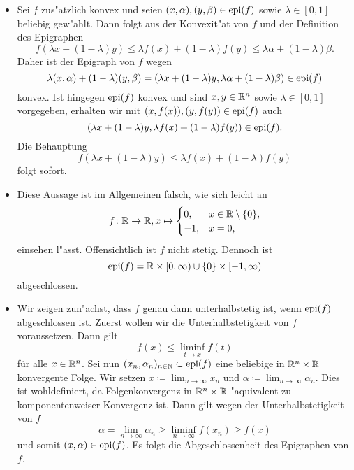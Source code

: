 \begin{itemize}
 \item[(i)] Sei $f$ zus"atzlich konvex und seien $(x,\alpha),(y,\beta)\in\operatorname{epi}(f)$ sowie $\lambda\in[0,1]$ beliebig gew"ahlt.
 Dann folgt aus der Konvexit"at von $f$ und der Definition des Epigraphen
 \begin{displaymath}
  f(\lambda x+(1-\lambda)y)\leq \lambda f(x)+(1-\lambda)f(y)\leq \lambda\alpha+(1-\lambda)\beta.
 \end{displaymath}
 Daher ist der Epigraph von $f$ wegen
 \[
\lambda(x,\alpha)+(1-\lambda)(y,\beta)=
(\lambda x+(1-\lambda)y,\lambda\alpha+(1-\lambda)\beta)\in\operatorname{epi}(f)
 \]
 konvex.
 Ist hingegen $\operatorname{epi}(f)$ konvex und sind $x,y\in\mathbb{R}^n$ sowie $\lambda\in[0,1]$ vorgegeben, erhalten wir mit
 $(x,f(x)),(y,f(y))\in\operatorname{epi}(f)$ auch
\[
 (\lambda x+(1-\lambda)y,\lambda f(x)+(1-\lambda)f(y))\in \operatorname{epi}(f).
 \]
 Die Behauptung
 \begin{displaymath}
  f(\lambda x+(1-\lambda)y)\leq\lambda f(x)+(1-\lambda)f(y)
 \end{displaymath}
 folgt sofort.

 \item[(ii)] Diese Aussage ist im Allgemeinen falsch, wie sich leicht an
 \begin{displaymath}
  f\colon\mathbb{R}\to\mathbb{R}, x\mapsto \begin{cases}
                       0, &x\in\mathbb{R}\setminus\{0\},\\
                       -1, &x=0,
                      \end{cases}
 \end{displaymath}
 einsehen l"asst. Offensichtlich ist $f$ nicht stetig. Dennoch ist
 \begin{displaymath}
  \operatorname{epi}(f)=\mathbb{R}\times[0,\infty)\cup\{0\}\times[-1,\infty)
 \end{displaymath}
 abgeschlossen.

 \item[(iii)]
 Wir zeigen zun"achst, dass $f$ genau dann unterhalbstetig ist, wenn $\operatorname{epi}(f)$ abgeschlossen ist.
 Zuerst wollen wir die Unterhalbstetigkeit von $f$ voraussetzen. Dann gilt
 \begin{displaymath}
  f(x)\leq\liminf_{t\to x}f(t)
 \end{displaymath}
 für alle $x\in\mathbb{R}^n$. Sei nun $(x_n,\alpha_n)_{n\in\mathbb{N}}\subset\operatorname{epi}(f)$ eine beliebige in $\mathbb{R}^n\times\mathbb{R}$ konvergente Folge.
 Wir setzen $x\coloneqq \lim_{n\to\infty} x_n$ und $\alpha\coloneqq\lim_{n\to\infty}\alpha_n$.
 Dies ist wohldefiniert, da Folgenkonvergenz in $\mathbb{R}^n\times\mathbb{R}$ "aquivalent zu komponentenweiser Konvergenz ist. Dann gilt
 wegen der Unterhalbstetigkeit von $f$
 \begin{displaymath}
  \alpha= \lim_{n\to\infty}\alpha_n \geq \liminf_{n\to\infty} f(x_n)\geq f(x)
 \end{displaymath}
 und somit $(x,\alpha)\in\operatorname{epi}(f)$. Es folgt die Abgeschlossenheit des Epigraphen von $f$.


\end{itemize}
